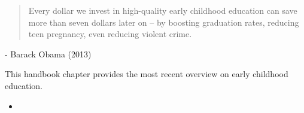 \begin{frame}
\begin{quote}\Large
Every dollar we invest in high-quality early childhood education can save more than seven dollars later on -- by boosting graduation rates, reducing teen pregnancy, even reducing violent crime.
\end{quote}\vspace{-0.5cm}\hspace{6cm} - Barack Obama (2013)
\nocite{Obama.2013, CEA.2015}
\end{frame}
\begin{frame}\begin{figure}
\end{figure}\end{frame}
\begin{frame}
This handbook chapter provides the most recent overview on early childhood education.
\begin{itemize}

\item  {}
\end{itemize}
\end{frame}
